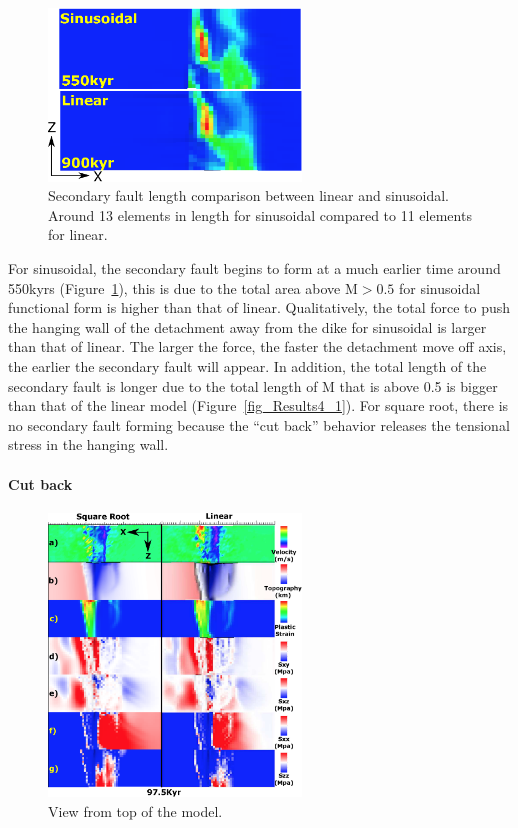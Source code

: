 \begin{figure}[hc]
  \centering
    \includegraphics[width=0.6\textwidth]{fig_Results4_2_secondary_fault_length_comparison.eps}
  \caption{Secondary fault length comparison between linear and sinusoidal. Around 13 elements in length for sinusoidal compared to 11 elements for linear.}
 \label{fig_Results4_2}
\end{figure}   

For sinusoidal, the secondary fault begins to form at a much earlier time around 550kyrs (Figure~\hyperref[fig_Results4_2]{\ref{fig_Results4_2}}), this is due to the total area above M$>0.5$ for sinusoidal functional form is higher than that of linear. Qualitatively, the total force to push the hanging wall of the detachment away from the dike for sinusoidal is larger than that of linear. The larger the force, the faster the detachment move off axis, the earlier the secondary fault will appear. In addition, the total length of the secondary fault is longer due to the total length of M that is above 0.5 is bigger than that of the linear model (Figure~\hyperref[fig_Results4_1]{\ref{fig_Results4_1}}). 
For square root, there is no secondary fault forming because the ``cut back'' behavior releases the tensional stress in the hanging wall.

\paragraph{Cut back}

\begin{figure}[hc]
  \centering
    \includegraphics[width=0.6\textwidth]{fig_Results4_3_sqrt_vs_lin_cut_back_97kyr.eps}
  \caption{View from top of the model.}
 \label{fig_Results4_3_1}
\end{figure}  

